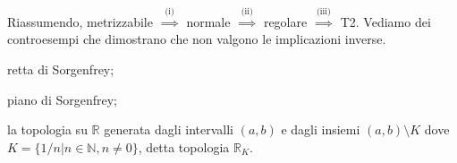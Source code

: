 Riassumendo, metrizzabile $\stackrel{\text{(i)}}{\implies}$ normale $\stackrel{\text{(ii)}}{\implies}$ regolare $\stackrel{\text{(iii)}}{\implies}$ T2. Vediamo dei controesempi che dimostrano che non valgono le implicazioni inverse.

\begin{ex}
  \begin{nlist}
    \item retta di Sorgenfrey;
    \item piano di Sorgenfrey;
    \item la topologia su $\mathbb{R}$ generata dagli intervalli $(a, b)$ e dagli insiemi $(a, b) \setminus K$ dove $K= \{ 1/n | n \in \mathbb{N}, n \not=0 \}$, detta topologia $\mathbb{R}_K$.
\end{nlist}
\end{ex}

